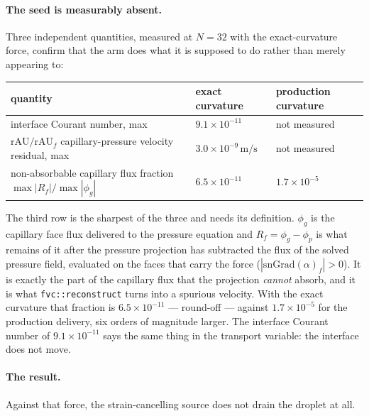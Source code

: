 \documentclass[preprint,3p,11pt]{elsarticle}
\begin{document}
\paragraph{The seed is measurably absent.} Three independent quantities, measured
at $N=32$ with the exact-curvature force, confirm that the arm does what it is
supposed to do rather than merely appearing to:
\begin{center}
\begin{tabular}{lll}
\toprule
quantity & exact curvature & production curvature \\
\midrule
interface Courant number, max & $9.1\times10^{-11}$ & not measured \\
$\mathrm{rAU}/\mathrm{rAU}_f$ capillary-pressure velocity residual, max
  & $3.0\times10^{-9}\,\mathrm{m/s}$ & not measured \\
non-absorbable capillary flux fraction $\max|R_f|/\max|\phi_g|$
  & $6.5\times10^{-11}$ & $1.7\times10^{-5}$ \\
\bottomrule
\end{tabular}
\end{center}
The third row is the sharpest of the three and needs its definition.
$\phi_g$ is the capillary face flux delivered to the pressure equation and
$R_f = \phi_g - \phi_{p}$ is what remains of it after the pressure projection has
subtracted the flux of the solved pressure field, evaluated on the faces that
carry the force ($|\mathrm{snGrad}(\alpha)_f| > 0$). It is exactly the part of
the capillary flux that the projection \emph{cannot} absorb, and it is what
\texttt{fvc::reconstruct} turns into a spurious velocity. With the exact
curvature that fraction is $6.5\times10^{-11}$ --- round-off --- against
$1.7\times10^{-5}$ for the production delivery, six orders of magnitude larger.
The interface Courant number of $9.1\times10^{-11}$ says the same thing in the
transport variable: the interface does not move.

\paragraph{The result.} Against that force, the strain-cancelling source does not
drain the droplet at all.
\end{document}
